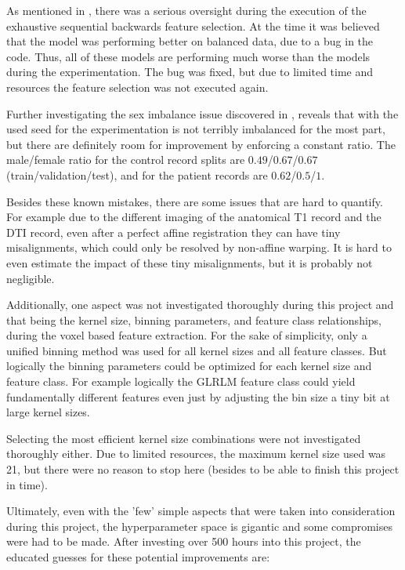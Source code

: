As mentioned in , there was a serious oversight during the execution of the exhaustive sequential backwards feature selection. At the time it was believed that the model was performing better on balanced data, due to a bug in the code. Thus, all of these models are performing much worse than the models during the experimentation. The bug was fixed, but due to limited time and resources the feature selection was not executed again.\par
Further investigating the sex imbalance issue discovered in , reveals that with the used seed for the experimentation is not terribly imbalanced for the most part, but there are definitely room for improvement by enforcing a constant ratio. The male/female ratio for the control record splits are $0.49$/$0.67$/$0.67$ (train/validation/test), and for the patient records are $0.62$/$0.5$/$1$.\par
Besides these known mistakes, there are some issues that are hard to quantify. For example due to the different imaging of the anatomical T1 record and the \ac{DTI} record, even after a perfect affine registration they can have tiny misalignments, which could only be resolved by non-affine warping. It is hard to even estimate the impact of these tiny misalignments, but it is probably not negligible.\par
Additionally, one aspect was not investigated thoroughly during this project and that being the kernel size, binning parameters, and feature class relationships, during the voxel based feature extraction. For the sake of simplicity, only a unified binning method was used for all kernel sizes and all feature classes. But logically the binning parameters could be optimized for each kernel size and feature class. For example logically the \ac{GLRLM} feature class could yield fundamentally different features even just by adjusting the bin size a tiny bit at large kernel sizes.\par
Selecting the most efficient kernel size combinations were not investigated thoroughly either. Due to limited resources, the maximum kernel size used was 21, but there were no reason to stop here (besides to be able to finish this project in time).\par
Ultimately, even with the 'few' simple aspects that were taken into consideration during this project, the hyperparameter space is gigantic and some compromises were had to be made. After investing over 500 hours into this project, the educated guesses for these potential improvements are:
